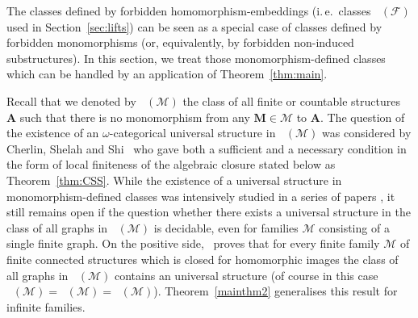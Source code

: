 \documentclass{elsarticle}
\newcommand{\ie}{i.\,e.}
\def\Forb{\mathop{\mathrm{Forb_{he}}}\nolimits}
\def\Forbm{\mathop{\mathrm{Forb_m}}\nolimits}
\def\Forbh{\mathop{\mathrm{Forb_h}}\nolimits}
\def\str#1{\mathbf {#1}}
\def\F{{\mathcal F}}
\theoremstyle{plain}
\theoremstyle{definition}
\theoremstyle{remark}
\begin{document}
The classes defined by forbidden homomorphism-embeddings (\ie{}\ classes $\Forb(\F)$
used in Section~\ref{sec:lifts}) can be seen as a special case of classes defined by
forbidden monomorphisms (or, equivalently, by forbidden non-induced
substructures).  In this section, we treat those monomorphism-defined classes which can be handled by
an application of Theorem~\ref{thm:main}.

Recall that we denoted by $\Forbm(\mathcal M)$ the
class of all finite or countable structures $\str{A}$ such that there is no monomorphism
from any $\str{M}\in \mathcal M$ to $\str{A}$.
The question of the existence of an $\omega$-categorical  universal structure in $\Forbm(\mathcal M)$ was considered by Cherlin, Shelah and
Shi~\cite{Cherlin1999} who gave both a sufficient and a necessary condition  in the form
of local finiteness of the algebraic closure stated below as Theorem~\ref{thm:CSS}.
While the  existence of a universal structure in monomorphism-defined classes
was intensively studied in a series of papers
\cite{Komjath1988,Cherlin1994,Cherlin1996,Cherlin1997,Furedi1997b,Cherlin2007,Cherlin2007a,Cherlin2007b,Cherlin2001,Cherlin2011,Cherlin2015},
it still remains open if the question whether there exists a universal structure in the class of all graphs in $\Forbm(\mathcal M)$ is decidable, even for families $\mathcal M$ consisting of a single finite graph. 
 On the positive side,~\cite{Cherlin1999} proves that for every finite family $\mathcal M$ of finite connected structures which is closed for homomorphic images the class of all graphs in $\Forbm(\mathcal M)$ contains an universal structure (of course in this case $\Forbm(\mathcal M)=\Forbh(\mathcal M)=\Forb(\mathcal M)$). Theorem~\ref{mainthm2}
generalises this result for infinite families.
\end{document}
